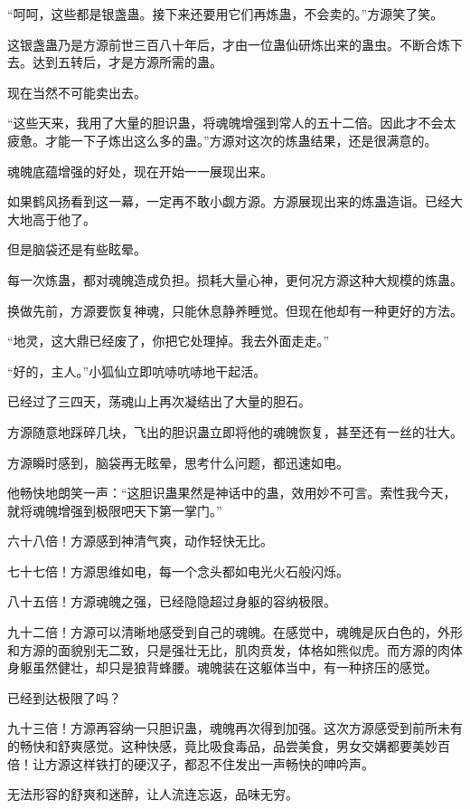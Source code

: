 \begin{this_body}
“呵呵，这些都是银盏蛊。接下来还要用它们再炼蛊，不会卖的。”方源笑了笑。

这银盏蛊乃是方源前世三百八十年后，才由一位蛊仙研炼出来的蛊虫。不断合炼下去。达到五转后，才是方源所需的蛊。

现在当然不可能卖出去。

“这些天来，我用了大量的胆识蛊，将魂魄增强到常人的五十二倍。因此才不会太疲惫。才能一下子炼出这么多的蛊。”方源对这次的炼蛊结果，还是很满意的。

魂魄底蕴增强的好处，现在开始一一展现出来。

如果鹤风扬看到这一幕，一定再不敢小觑方源。方源展现出来的炼蛊造诣。已经大大地高于他了。

但是脑袋还是有些眩晕。

每一次炼蛊，都对魂魄造成负担。损耗大量心神，更何况方源这种大规模的炼蛊。

换做先前，方源要恢复神魂，只能休息静养睡觉。但现在他却有一种更好的方法。

“地灵，这大鼎已经废了，你把它处理掉。我去外面走走。”

“好的，主人。”小狐仙立即吭哧吭哧地干起活。

已经过了三四天，荡魂山上再次凝结出了大量的胆石。

方源随意地踩碎几块，飞出的胆识蛊立即将他的魂魄恢复，甚至还有一丝的壮大。

方源瞬时感到，脑袋再无眩晕，思考什么问题，都迅速如电。

他畅快地朗笑一声：“这胆识蛊果然是神话中的蛊，效用妙不可言。索性我今天，就将魂魄增强到极限吧天下第一掌门。”

六十八倍！方源感到神清气爽，动作轻快无比。

七十七倍！方源思维如电，每一个念头都如电光火石般闪烁。

八十五倍！方源魂魄之强，已经隐隐超过身躯的容纳极限。

九十二倍！方源可以清晰地感受到自己的魂魄。在感觉中，魂魄是灰白色的，外形和方源的面貌别无二致，只是强壮无比，肌肉贲发，体格如熊似虎。而方源的肉体身躯虽然健壮，却只是狼背蜂腰。魂魄装在这躯体当中，有一种挤压的感觉。

已经到达极限了吗？

九十三倍！方源再容纳一只胆识蛊，魂魄再次得到加强。这次方源感受到前所未有的畅快和舒爽感觉。这种快感，竟比吸食毒品，品尝美食，男女交媾都要美妙百倍！让方源这样铁打的硬汉子，都忍不住发出一声畅快的呻吟声。

无法形容的舒爽和迷醉，让人流连忘返，品味无穷。


\end{this_body}

